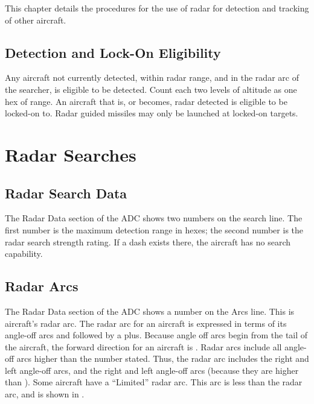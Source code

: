 \label{rule:air-to-air-radar}

This chapter details the procedures for the use of radar for detection and tracking of other aircraft.

\subsection{Detection and Lock-On Eligibility} Any aircraft not currently detected, within radar range, and in the radar arc of the searcher, is eligible to be detected. Count each two levels of altitude as one hex of range. An aircraft that is, or becomes, radar detected is eligible to be locked-on to. Radar guided missiles may only be launched at locked-on targets.

\section{Radar Searches}
\label{rule:normal-mode-searching}

\subsection{Radar Search Data} The Radar Data section of the ADC shows two numbers on the search line. The first number is the maximum detection range in hexes; the second number is the radar search strength rating. If a dash exists there, the aircraft has no search capability.


\subsection{Radar Arcs} The Radar Data section of the ADC shows a number on the Arcs line. This is aircraft's radar arc. The radar arc for an aircraft is expressed in terms of its angle-off arcs and followed by a plus. Because angle off arcs begin from the tail of the aircraft, the forward direction for an aircraft is .  Radar arcs include all angle-off arcs higher than the number stated. Thus, the  radar arc includes the right and left  angle-off arcs, and the right and left  angle-off arcs (because they are higher than ). Some aircraft have a “Limited” radar arc. This arc is less than the  radar arc, and is shown in . 

